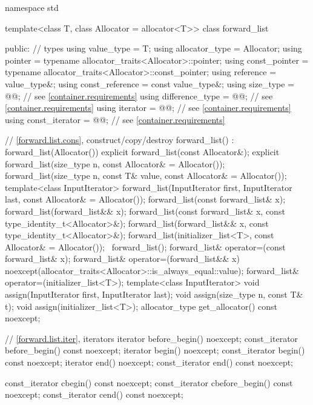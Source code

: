 \begin{codeblock}
namespace std {
  template<class T, class Allocator = allocator<T>>
  class forward_list {
  public:
    // types
    using value_type      = T;
    using allocator_type  = Allocator;
    using pointer         = typename allocator_traits<Allocator>::pointer;
    using const_pointer   = typename allocator_traits<Allocator>::const_pointer;
    using reference       = value_type&;
    using const_reference = const value_type&;
    using size_type       = @@; // see \ref{container.requirements}
    using difference_type = @@; // see \ref{container.requirements}
    using iterator        = @@; // see \ref{container.requirements}
    using const_iterator  = @@; // see \ref{container.requirements}

    // \ref{forward.list.cons}, construct/copy/destroy
    forward_list() : forward_list(Allocator()) { }
    explicit forward_list(const Allocator&);
    explicit forward_list(size_type n, const Allocator& = Allocator());
    forward_list(size_type n, const T& value, const Allocator& = Allocator());
    template<class InputIterator>
      forward_list(InputIterator first, InputIterator last, const Allocator& = Allocator());
    forward_list(const forward_list& x);
    forward_list(forward_list&& x);
    forward_list(const forward_list& x, const type_identity_t<Allocator>&);
    forward_list(forward_list&& x, const type_identity_t<Allocator>&);
    forward_list(initializer_list<T>, const Allocator& = Allocator());
    ~forward_list();
    forward_list& operator=(const forward_list& x);
    forward_list& operator=(forward_list&& x)
      noexcept(allocator_traits<Allocator>::is_always_equal::value);
    forward_list& operator=(initializer_list<T>);
    template<class InputIterator>
      void assign(InputIterator first, InputIterator last);
    void assign(size_type n, const T& t);
    void assign(initializer_list<T>);
    allocator_type get_allocator() const noexcept;

    // \ref{forward.list.iter}, iterators
    iterator before_begin() noexcept;
    const_iterator before_begin() const noexcept;
    iterator begin() noexcept;
    const_iterator begin() const noexcept;
    iterator end() noexcept;
    const_iterator end() const noexcept;

    const_iterator cbegin() const noexcept;
    const_iterator cbefore_begin() const noexcept;
    const_iterator cend() const noexcept;

}}
\end{codeblock}
